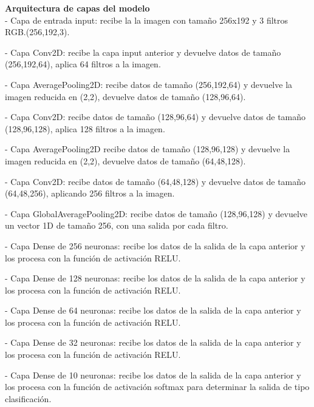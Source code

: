 \documentclass[colorinlistoftodos,twoside,twocolumn,10pt]{article} %
\begin{document}
\textbf{\large Arquitectura de capas del modelo}\\
- Capa de entrada input: recibe la la imagen con tamaño 256x192 y 3 filtros RGB.(256,192,3).

- Capa Conv2D: recibe la capa input anterior y devuelve datos de tamaño (256,192,64), aplica 64 filtros a la imagen.

- Capa AveragePooling2D: recibe datos de tamaño (256,192,64) y devuelve la imagen reducida en (2,2), devuelve datos de tamaño (128,96,64).

- Capa Conv2D: recibe datos de tamaño (128,96,64) y devuelve datos de tamaño (128,96,128), aplica 128 filtros a la imagen.

- Capa AveragePooling2D recibe datos de tamaño (128,96,128) y devuelve la imagen reducida en (2,2), devuelve datos de tamaño (64,48,128).

- Capa Conv2D: recibe datos de tamaño (64,48,128) y devuelve datos de tamaño (64,48,256), aplicando 256 filtros a la imagen.

- Capa GlobalAveragePooling2D: recibe datos de tamaño (128,96,128) y devuelve un vector 1D \cite{Machine Learning and Deep Learning methods for music genre Classification} de tamaño 256, con una salida por cada filtro.

- Capa Dense de 256 neuronas: recibe los datos de la salida de la capa anterior y los procesa con la función de activación RELU.

- Capa Dense de 128 neuronas: recibe los datos de la salida de la capa anterior y los procesa con la función de activación RELU.

- Capa Dense de 64 neuronas: recibe los datos de la salida de la capa anterior y los procesa con la función de activación RELU.

- Capa Dense de 32 neuronas: recibe los datos de la salida de la capa anterior y los procesa con la función de activación RELU.

- Capa Dense de 10 neuronas: recibe los datos de la salida de la capa anterior y los procesa con la función de activación softmax para determinar la salida de tipo clasificación.
\end{document}
